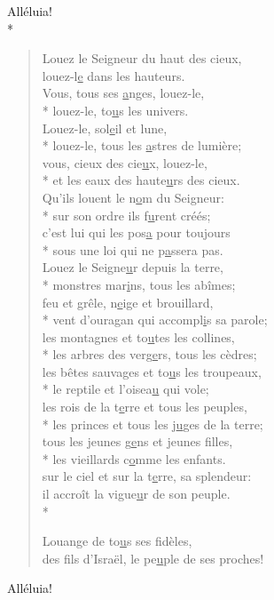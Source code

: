 Alléluia! \\*

\begin{verse}
Louez le Seigneur du haut des cieux, \\
louez-l\underline{e} dans les hauteurs. \\
Vous, tous ses \underline{a}nges, louez-le, \\*
louez-le, to\underline{u}s les univers. \\

Louez-le, sol\underline{e}il et lune, \\*
louez-le, tous les \underline{a}stres de lumière; \\
vous, cieux des cie\underline{u}x, louez-le, \\*
et les eaux des haute\underline{u}rs des cieux. \\

Qu’ils louent le n\underline{o}m du Seigneur: \\*
sur son ordre ils f\underline{u}rent créés; \\
c’est lui qui les pos\underline{a} pour toujours \\*
sous une loi qui ne p\underline{a}ssera pas. \\

Louez le Seigne\underline{u}r depuis la terre, \\*
monstres mar\underline{i}ns, tous les abîmes; \\
feu et grêle, n\underline{e}ige et brouillard, \\*
vent d’ouragan qui accompl\underline{i}s sa parole; \\

les montagnes et to\underline{u}tes les collines, \\*
les arbres des verg\underline{e}rs, tous les cèdres; \\
les bêtes sauvages et to\underline{u}s les troupeaux, \\*
le reptile et l’oisea\underline{u} qui vole; \\

les rois de la t\underline{e}rre et tous les peuples, \\*
les princes et tous les j\underline{u}ges de la terre; \\
tous les jeunes g\underline{e}ns et jeunes filles, \\*
les vieillards c\underline{o}mme les enfants. \\

sur le ciel et sur la t\underline{e}rre, sa splendeur: \\
il accroît la vigue\underline{u}r de son peuple. \\*

Louange de to\underline{u}s ses fidèles, \\
des fils d’Israël, le pe\underline{u}ple de ses proches! \\
\end{verse}

Alléluia! \\

